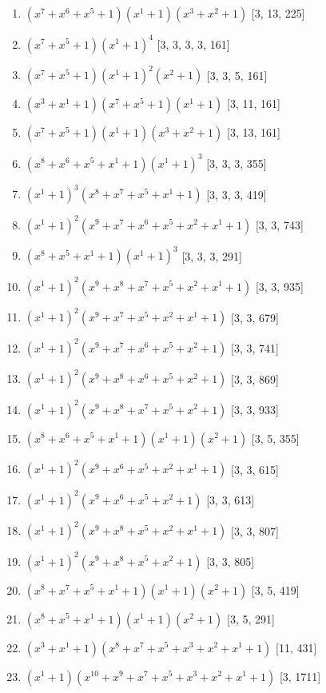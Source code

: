 \documentclass[10pt,twocolumn]{article}
\begin{document}
\begin{enumerate}
\item $(x^{7} + x^{6} + x^{5} + 1)(x^{1} + 1)(x^{3} + x^{2} + 1)$  [3, 13, 225]
\item $(x^{7} + x^{5} + 1)(x^{1} + 1)^{4}$  [3, 3, 3, 3, 161]
\item $(x^{7} + x^{5} + 1)(x^{1} + 1)^{2}(x^{2} + 1)$  [3, 3, 5, 161]
\item $(x^{3} + x^{1} + 1)(x^{7} + x^{5} + 1)(x^{1} + 1)$  [3, 11, 161]
\item $(x^{7} + x^{5} + 1)(x^{1} + 1)(x^{3} + x^{2} + 1)$  [3, 13, 161]
\item $(x^{8} + x^{6} + x^{5} + x^{1} + 1)(x^{1} + 1)^{3}$  [3, 3, 3, 355]
\item $(x^{1} + 1)^{3}(x^{8} + x^{7} + x^{5} + x^{1} + 1)$  [3, 3, 3, 419]
\item $(x^{1} + 1)^{2}(x^{9} + x^{7} + x^{6} + x^{5} + x^{2} + x^{1} + 1)$  [3, 3, 743]
\item $(x^{8} + x^{5} + x^{1} + 1)(x^{1} + 1)^{3}$  [3, 3, 3, 291]
\item $(x^{1} + 1)^{2}(x^{9} + x^{8} + x^{7} + x^{5} + x^{2} + x^{1} + 1)$  [3, 3, 935]
\item $(x^{1} + 1)^{2}(x^{9} + x^{7} + x^{5} + x^{2} + x^{1} + 1)$  [3, 3, 679]
\item $(x^{1} + 1)^{2}(x^{9} + x^{7} + x^{6} + x^{5} + x^{2} + 1)$  [3, 3, 741]
\item $(x^{1} + 1)^{2}(x^{9} + x^{8} + x^{6} + x^{5} + x^{2} + 1)$  [3, 3, 869]
\item $(x^{1} + 1)^{2}(x^{9} + x^{8} + x^{7} + x^{5} + x^{2} + 1)$  [3, 3, 933]
\item $(x^{8} + x^{6} + x^{5} + x^{1} + 1)(x^{1} + 1)(x^{2} + 1)$  [3, 5, 355]
\item $(x^{1} + 1)^{2}(x^{9} + x^{6} + x^{5} + x^{2} + x^{1} + 1)$  [3, 3, 615]
\item $(x^{1} + 1)^{2}(x^{9} + x^{6} + x^{5} + x^{2} + 1)$  [3, 3, 613]
\item $(x^{1} + 1)^{2}(x^{9} + x^{8} + x^{5} + x^{2} + x^{1} + 1)$  [3, 3, 807]
\item $(x^{1} + 1)^{2}(x^{9} + x^{8} + x^{5} + x^{2} + 1)$  [3, 3, 805]
\item $(x^{8} + x^{7} + x^{5} + x^{1} + 1)(x^{1} + 1)(x^{2} + 1)$  [3, 5, 419]
\item $(x^{8} + x^{5} + x^{1} + 1)(x^{1} + 1)(x^{2} + 1)$  [3, 5, 291]
\item $(x^{3} + x^{1} + 1)(x^{8} + x^{7} + x^{5} + x^{3} + x^{2} + x^{1} + 1)$  [11, 431]
\item $(x^{1} + 1)(x^{10} + x^{9} + x^{7} + x^{5} + x^{3} + x^{2} + x^{1} + 1)$  [3, 1711]

\end{enumerate}
\end{document}
